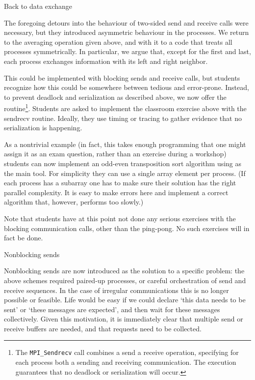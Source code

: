  {Back to data exchange}

The foregoing detours into the behaviour of two-sided send and receive calls
were necessary, but they introduced asymmetric behaviour in the processes.
We return to the averaging operation given above, and with it to a code
that treats all processes symmetrically.
In particular, we argue that, except for the first and last,
each process exchanges information with its left and right neighbor.

This could be implemented with blocking sends and receive calls, but
students recognize how this could be somewhere between tedious and
error-prone.  Instead, to prevent deadlock and serialization as
described above, we now offer the 
routine\footnote{The {\tt MPI\_Sendrecv} call combines a send a receive
  operation, specifying for each process both a sending and receiving
  communication. The execution guarantees that no deadlock or
  serialization will occur.}. Students are asked to implement the
classroom exercise above with the sendrecv routine.  Ideally, they use
timing or tracing to gather evidence that no serialization is
happening.

As a nontrivial example (in fact, this takes enough programming that
one might assign it as an exam question, rather than an exercise
during a workshop) students can now implement an odd-even
transposition sort
algorithm using  as the main tool.
For simplicity they can use a single array element per process.
(If each process has a subarray one has to make sure their solution
has the right parallel complexity. It is easy to make errors here
and implement a correct algorithm that, however, performs too slowly.)

Note that students have at this point not done any serious exercises
with the blocking communication calls, other than the ping-pong.
No such exercises will in fact be done.

 {Nonblocking sends}
\label{sec:mental-nonblock}

Nonblocking sends are now introduced as the solution to a specific problem:
the above schemes required paired-up processes, or careful orchestration
of send and receive sequences. In the case of irregular communications
%
%
this is no longer possible or feasible. Life would be easy if we could
declare `this data needs to be sent' or `these messages are expected',
and then wait for these messages collectively.
Given this motivation, it is immediately clear that multiple send or receive
buffers are needed, and that requests need to be collected.

